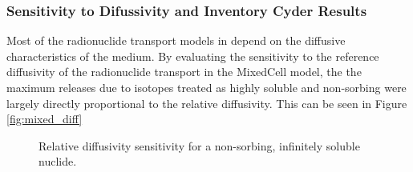 
\subsubsection{Sensitivity to Difussivity and Inventory Cyder Results}
Most of the radionuclide transport models in \Cyder depend on the diffusive 
characteristics of the medium. By evaluating the sensitivity to the reference 
diffusivity of the radionuclide transport in the MixedCell model, the 
the maximum releases due to isotopes treated as highly soluble and non-sorbing
were largely directly proportional to the relative diffusivity. 
This can be seen in Figure \ref{fig:mixed_diff} 
\begin{figure}[ht]
\centering
\caption{Relative diffusivity sensitivity for a non-sorbing, infinitely soluble 
nuclide.}
\label{fig:DCInvI129}
\end{figure}
